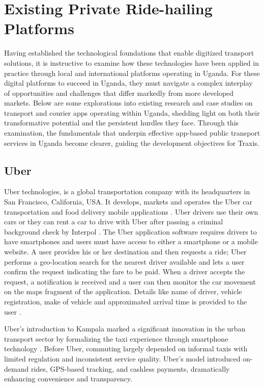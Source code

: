 \section{Existing Private Ride-hailing Platforms}
Having established the technological foundations that enable digitized transport
solutions, it is instructive to examine how these technologies have been applied
in practice through local and international  platforms operating in Uganda. For
these digital platforms to succeed in Uganda, they must navigate a complex
interplay of opportunities and challenges that differ markedly from more
developed markets. Below are some explorations into existing research and case
studies on transport and courier apps operating within Uganda, shedding light on
both their transformative potential and the persistent hurdles they face.
Through this examination, the fundamentals that underpin effective app-based
public transport services in Uganda become clearer, guiding the development
objectives for Traxis.


\subsection{Uber}
Uber technologies, is a global transportation company with its headquarters in
San Francisco, California, USA. It develops, markets and operates the Uber car
transportation and food delivery mobile applications \cite{uber2026about}. Uber
drivers use their own cars or they can rent a car to drive with Uber after
passing a criminal background check by Interpol \cite{uber2026rentalfaq}. The
Uber application software requires drivers to have smartphones and users must
have access to either a smartphone or a mobile website. A user provides his or
her destination and then requests a ride; Uber performs a geo-location search
for the nearest driver available and lets a user confirm the request indicating
the fare to be paid. When a driver accepts the request, a notification is
received and a user can then monitor the car movement on the maps fragment of
the application. Details like name of driver, vehicle registration, make of
vehicle and approximated arrival time is provided to the user
\cite{uber2026howitworks}.


Uber’s introduction to Kampala marked a significant innovation in the urban
transport sector by formalizing the taxi experience through smartphone
technology \cite{Kayi2019}. Before Uber, commuting largely depended on informal
taxis with limited regulation and inconsistent service quality. Uber’s model
introduced on-demand rides, GPS-based tracking, and cashless payments,
dramatically enhancing convenience and transparency\cite{Kayi2019}.


